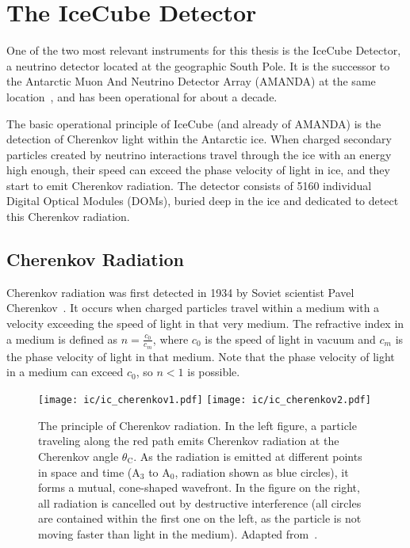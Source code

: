 \chapter{The IceCube Detector}\label{ic}
One of the two most relevant instruments for this thesis is the IceCube Detector, a neutrino detector located at the geographic South Pole. It is the successor to the Antarctic Muon And Neutrino Detector Array (AMANDA) at the same location~, and has been operational for about a decade.

The basic operational principle of IceCube (and already of AMANDA) is the detection of Cherenkov light within the Antarctic ice. When charged secondary particles created by neutrino interactions travel through the ice with an energy high enough, their speed can exceed the phase velocity of light in ice, and they start to emit Cherenkov radiation. The detector consists of 5160 individual Digital Optical Modules (DOMs), buried deep in the ice and dedicated to detect this Cherenkov radiation.

\section{Cherenkov Radiation}\label{cherenkov_radiation}

Cherenkov radiation was first detected in 1934 by Soviet scientist Pavel Cherenkov~. It occurs when charged particles travel within a medium with a velocity exceeding the speed of light in that very medium. The refractive index in a medium is defined as $n=\frac{c_0}{c_m}$, where $c_0$ is the speed of light in vacuum and $c_m$ is the phase velocity of light in that medium. Note that the phase velocity of light in a medium can exceed $c_0$, so $n<1$ is possible.

\begin{figure}
    \texttt{[image: ic/ic\_cherenkov1.pdf]}
    \texttt{[image: ic/ic\_cherenkov2.pdf]}
    \caption[Cherenkov radiation]{The principle of Cherenkov radiation. In the left figure, a particle traveling along the red path emits Cherenkov radiation at the Cherenkov angle $\theta_\text{C}$. As the radiation is emitted at different points in space and time ($\text{A}_3$ to $\text{A}_0$, radiation shown as blue circles), it forms a mutual, cone-shaped wavefront. In the figure on the right, all radiation is cancelled out by destructive interference (all circles are contained within the first one on the left, as the particle is not moving faster than light in the medium). Adapted from~\cite{LAnnunziata2020}.}
\end{figure}

